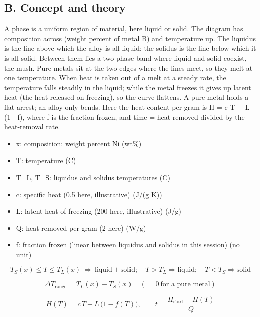 \documentclass[11pt,a4paper]{article}
\begin{document}
\subsection*{B. Concept and theory}
A phase is a uniform region of material, here liquid or solid. The diagram has composition across (weight percent of metal B) and temperature up. The liquidus is the line above which the alloy is all liquid; the solidus is the line below which it is all solid. Between them lies a two-phase band where liquid and solid coexist, the mush. Pure metals sit at the two edges where the lines meet, so they melt at one temperature. When heat is taken out of a melt at a steady rate, the temperature falls steadily in the liquid; while the metal freezes it gives up latent heat (the heat released on freezing), so the curve flattens. A pure metal holds a flat arrest; an alloy only bends. Here the heat content per gram is H = c T + L (1 - f), where f is the fraction frozen, and time = heat removed divided by the heat-removal rate.

\begin{itemize}[nosep]
\item x: composition: weight percent Ni (wt\%)
\item T: temperature (C)
\item T\_L, T\_S: liquidus and solidus temperatures (C)
\item c: specific heat (0.5 here, illustrative) (J/(g K))
\item L: latent heat of freezing (200 here, illustrative) (J/g)
\item Q: heat removed per gram (2 here) (W/g)
\item f: fraction frozen (linear between liquidus and solidus in this session) (no unit)
\end{itemize}

\begin{equation*}
T_S(x)\le T\le T_L(x)\ \Rightarrow\ \text{liquid}+\text{solid};\quad T>T_L\Rightarrow\text{liquid};\quad T<T_S\Rightarrow\text{solid}
\end{equation*}

\begin{equation*}
\Delta T_{\text{range}}=T_L(x)-T_S(x)\quad(=0\ \text{for a pure metal})
\end{equation*}

\begin{equation*}
H(T)=c\,T+L\,\bigl(1-f(T)\bigr),\qquad t=\dfrac{H_{\text{start}}-H(T)}{Q}
\end{equation*}
\end{document}

